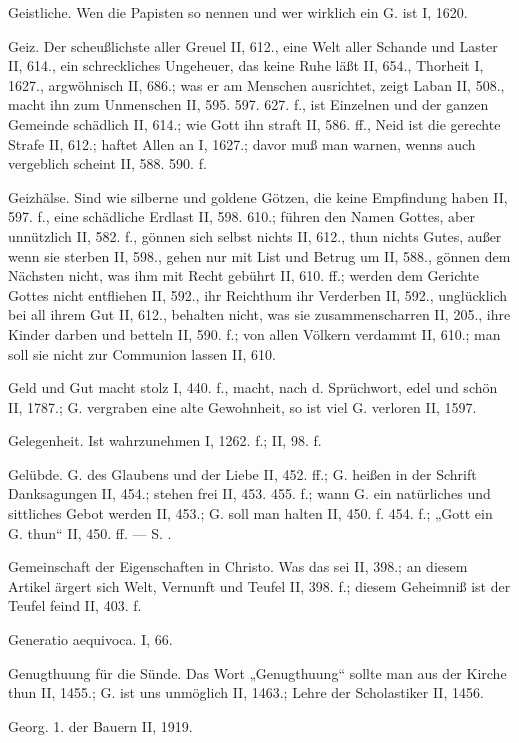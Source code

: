 Geistliche. Wen die Papisten so nennen und wer wirklich ein G. ist I, 1620.

Geiz. Der scheußlichste aller Greuel II, 612., eine Welt aller Schande und Laster II, 614., ein schreckliches Ungeheuer, das keine Ruhe läßt II, 654., Thorheit I, 1627., argwöhnisch II, 686.; was er am Menschen ausrichtet, zeigt Laban II, 508., macht ihn zum Unmenschen II, 595. 597. 627. f., ist Einzelnen und der ganzen Gemeinde schädlich II, 614.; wie Gott ihn straft II, 586. ff., Neid ist die gerechte Strafe II, 612.; haftet Allen an I, 1627.; davor muß man warnen, wenns auch vergeblich scheint II, 588. 590. f.

Geizhälse. Sind wie silberne und goldene Götzen, die keine Empfindung haben II, 597. f., eine schädliche Erdlast II, 598. 610.; führen den Namen Gottes, aber unnützlich II, 582. f., gönnen sich selbst nichts II, 612., thun nichts Gutes, außer wenn sie sterben II, 598., gehen nur mit List und Betrug um II, 588., gönnen dem Nächsten
nicht, was ihm mit Recht gebührt II, 610. ff.; werden dem Gerichte Gottes nicht entfliehen II, 592., ihr Reichthum ihr Verderben II, 592., unglücklich bei all ihrem Gut II, 612., behalten nicht, was sie zusammenscharren II, 205., ihre Kinder darben und betteln II, 590. f.; von allen Völkern verdammt II, 610.; man soll sie nicht zur Communion lassen II, 610.

Geld und Gut macht stolz I, 440. f., macht, nach d. Sprüchwort, edel und schön II, 1787.; G. vergraben eine alte Gewohnheit, so ist viel G. verloren II, 1597.

Gelegenheit. Ist wahrzunehmen I, 1262. f.; II, 98. f.

Gelübde. G. des Glaubens und der Liebe II, 452. ff.; G. heißen in der Schrift Danksagungen II, 454.; stehen frei II, 453. 455. f.; wann G. ein natürliches und sittliches Gebot werden II, 453.; G. soll man halten II, 450. f. 454. f.; „Gott ein G. thun“ II, 450. ff. — S. .

Gemeinschaft der Eigenschaften in Christo. Was das sei II, 398.; an diesem Artikel ärgert sich Welt, Vernunft und Teufel II, 398. f.; diesem Geheimniß ist der Teufel feind II, 403. f.

Generatio aequivoca. I, 66.

Genugthuung für die Sünde. Das Wort „Genugthuung“ sollte man aus der Kirche thun II, 1455.; G. ist uns unmöglich II, 1463.; Lehre der Scholastiker II, 1456.

Georg. 1.  der Bauern II, 1919.

